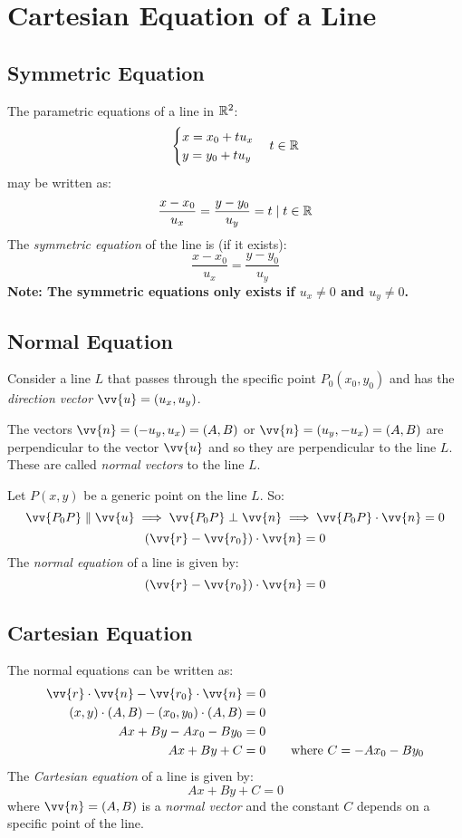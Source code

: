 \section{Cartesian Equation of a Line}
\subsection{Symmetric Equation}
	The parametric equations of a line in $\mathbb{R}^2$:
	\begin{equation*}
		\begin{cases}
			x = x_0 + tu_x\\
			y = y_0 + tu_y
		\end{cases}
		t \in \mathbb{R}
	\end{equation*}
	may be written as:
	\[\frac{x - x_0}{u_x} = \frac{y - y_0}{u_y} = t \mid t \in \mathbb{R}\]
	The \emph{symmetric equation} of the line is (if it exists):
	\[\frac{x - x_0}{u_x} = \frac{y - y_0}{u_y}\]
	\textbf{Note: The symmetric equations only exists if $u_x \neq 0$ and $u_y \neq 0$.}
\subsection{Normal Equation}
	Consider a line $L$ that passes through the specific point $P_0(x_0, y_0)$ and has the \emph{direction vector} $\vv{u} = (u_x, u_y)$.
	
	The vectors $\vv{n} = (-u_y, u_x) = (A, B)$ or $\vv{n} = (u_y, -u_x) = (A, B)$ are perpendicular to the vector $\vv{u}$ and so they are perpendicular to the line $L$.
	These are called \emph{normal vectors} to the line $L$.

	Let $P(x, y)$ be a generic point on the line $L$. So:
	\[\vv{P_0P} \parallel \vv{u} \implies \vv{P_0P} \perp \vv{n} \implies \vv{P_0P} \cdot \vv{n} = 0\]
	\[(\vv{r} - \vv{r_0}) \cdot \vv{n} = 0\]
	The \emph{normal equation} of a line is given by:
	\[(\vv{r} - \vv{r_0}) \cdot \vv{n} = 0\]
\subsection{Cartesian Equation}
	The normal equations can be written as:
	\begin{align*}
		\vv{r} \cdot \vv{n} - \vv{r_0} \cdot \vv{n} &= 0\\
		(x,y) \cdot (A,B) - (x_0,y_0) \cdot (A,B) &= 0\\
		Ax + By - Ax_0 - By_0 &= 0\\
		Ax + By + C &= 0 \qquad \text{where } C = -Ax_0 - By_0
	\end{align*}
	The \emph{Cartesian equation} of a line is given by:
	\[Ax + By + C = 0\]
	where
	$\vv{n} = (A,B)$ is a \emph{normal vector} and the constant $C$ depends on a specific point of the line.
